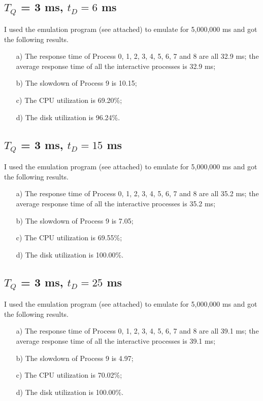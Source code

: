 \documentclass[12pt,letterpaper]{article}
\begin{document}
\subsection{$T_Q$ = 3 ms, $t_D=6$ ms}
I used the emulation program (see attached) to emulate for 5,000,000 ms and got the following results.
\begin{enumerate}
\item[a)] The response time of Process 0, 1, 2, 3, 4, 5, 6, 7 and 8 are all 32.9 ms; the average response time of all the interactive processes is 32.9 ms;
\item[b)] The slowdown of Process 9 is 10.15;
\item[c)] The CPU utilization is 69.20\%;
\item[d)] The disk utilization is 96.24\%.
\end{enumerate}

\subsection{$T_Q$ = 3 ms, $t_D=15$ ms}
I used the emulation program (see attached) to emulate for 5,000,000 ms and got the following results.
\begin{enumerate}
\item[a)] The response time of Process 0, 1, 2, 3, 4, 5, 6, 7 and 8 are all 35.2 ms; the average response time of all the interactive processes is 35.2 ms;
\item[b)] The slowdown of Process 9 is 7.05;
\item[c)] The CPU utilization is 69.55\%;
\item[d)] The disk utilization is 100.00\%.
\end{enumerate}

\subsection{$T_Q$ = 3 ms, $t_D=25$ ms}
I used the emulation program (see attached) to emulate for 5,000,000 ms and got the following results.
\begin{enumerate}
\item[a)] The response time of Process 0, 1, 2, 3, 4, 5, 6, 7 and 8 are all 39.1 ms; the average response time of all the interactive processes is 39.1 ms;
\item[b)] The slowdown of Process 9 is 4.97;
\item[c)] The CPU utilization is 70.02\%;
\item[d)] The disk utilization is 100.00\%.
\end{enumerate}
\end{document}
